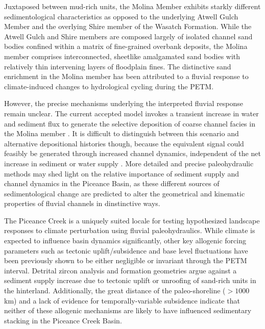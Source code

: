 \documentclass[draft]{compact_proposal}
\begin{document}
Juxtaposed between mud-rich units, the Molina Member exhibits starkly different sedimentological characteristics as opposed to the underlying Atwell Gulch Member and the overlying Shire member of the Wasatch Formation.
While the Atwell Gulch and Shire members are composed largely of isolated channel sand bodies confined within a matrix of fine-grained overbank deposits, the Molina member comprises interconnected, sheetlike amalgamated sand bodies with relatively thin intervening layers of floodplain fines.
The distinctive sand enrichment in the Molina member has been attributed to a fluvial response to climate-induced changes to hydrological cycling during the PETM.

However, the precise mechanisms underlying the interpreted fluvial response remain unclear.
The current accepted model invokes a transient increase in water and sediment flux to generate the selective deposition of coarse channel facies in the Molina member \cnote[bzf].
It is difficult to distinguish between this scenario and alternative depositional histories though, because the equivalent signal could feasibly be generated through increased channel dynamics, independent of the net increase in sediment or water supply .
More detailed and precise paleohydraulic methods may shed light on the relative importance of sediment supply and channel dynamics in the Piceance Basin, as these different sources of sedimentological change are predicted to alter the geometrical and kinematic properties of fluvial channels in dinstinctive ways.

The Piceance Creek is a uniquely suited locale for testing hypothesized landscape responses to climate perturbation using fluvial paleohydraulics.
While climate is expected to influence basin dynamics significantly, other key allogenic forcing parameters such as tectonic uplift/subsidence and base level fluctuations have been previously shown to be either negligible or invariant through the PETM interval.
Detrital zircon analysis and formation geometries argue against a sediment supply increase due to tectonic uplift or unroofing of sand-rich units in the hinterland.
Additionally, the great distance of the paleo-shoreline ($>1000$km) and a lack of evidence for temporally-variable subsidence indicate that neither of these allogenic mechanisms are likely to have influenced sedimentary stacking in the Piceance Creek Basin.

%
%
%
%
\end{document}
